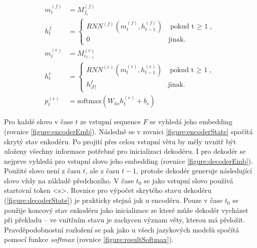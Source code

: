 \begin{align}
    m^{(f)}_{t}&=M^{(f)}_{f_t}\label{figure:encoderEmb} \\
    h^{f}_{t}&=\begin{cases}
                    RNN^{(f)}(m^{(f)}_{t},h^{(f)}_{t-1}) & \mbox{pokud t $\geq$ 1},\label{figure:encoderState} \\
                    0 & \mbox{jinak}.
                \end{cases}\\
    m^{(e)}_{t}&=M^{(e)}_{e_{t-1}}\label{figure:decoderEmb} \\
    h^{e}_{t}&=\begin{cases}
                    RNN^{(e)}(m^{(e)}_{t},h^{(e)}_{t-1}) & \mbox{pokud t $\geq$ 1},\\
                    h^{f}_{|F|} & \mbox{jinak}.
                \end{cases}\label{figure:decoderState} \\
    p^{(e)}_{t}&=\mbox{softmax}(W_{hs}h^{(e)}_{t} + b_{s}) \label{figure:resultSoftmax}
\end{align}


Pro každé slovo v čase $t$ ze vstupní sequence $F$ se vyhledá jeho embedding (rovnice \ref{figure:encoderEmb}). Následně se v rovnici \ref{figure:encoderState} spočítá skrytý stav enkodéru. Po projití přes celou vstupní větu by měly uvnitř být uloženy všechny informace potřebné pro inicializaci dekodéru. I pro dekodér se nejprve vyhledá pro vstupní slovo jeho embedding (rovnice \ref{figure:decoderEmb}). Použité slovo není z času $t$, ale z času $t-1$, protože dekodér generuje následující slovo vždy na základě předchozího. V čase $t_0$ se jako vstupní slovo používá startovní token <s>. Rovnice pro výpočet skrytého stavu dekodéru (\ref{figure:decoderState}) je prakticky stejná jak u encodéru. Pouze v čase $t_0$ se použije koncový stav enkodéru jako inicializace ze které může dekodér vycházet při překladu -- ve vnitřním stavu je zachycen význam věty, kterou má přeložit. Pravděpodobnostní rozložení se pak jako u všech jazykových modelů spočítá pomocí funkce \emph{softmax} (rovnice \ref{figure:resultSoftmax}).


\begin{figure}
    \begin{center}
    \end{center}
	\caption{}
	\label{img:seq2seq}
\end{figure}



